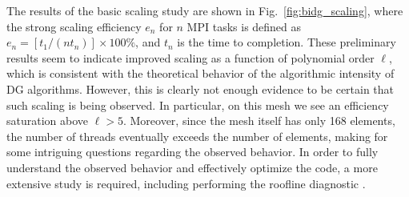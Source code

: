 The results of the basic scaling study are shown in
Fig.~\ref{fig:bidg_scaling}, where the strong scaling efficiency $e_{n}$ for
$n$ MPI tasks is defined as $e_{n}= [t_{1}/(nt_{n})]\times 100\%$, and $t_n$ is the time to
completion. These preliminary results seem to indicate improved scaling as a function of polynomial order $\ell$, which is consistent with the theoretical
behavior of the algorithmic intensity of DG algorithms.  However, this is
clearly not enough evidence to be certain that such scaling is being observed.
In particular, on this mesh we see an efficiency saturation above $\ell>5$.
Moreover, since the mesh itself has only 168 elements, the number of threads
eventually exceeds the number of elements, making for some intriguing questions
regarding the observed behavior.  In order to fully understand the observed behavior and
effectively optimize the code, a more extensive study is required, including performing
%
the roofline diagnostic
\cite{Williams:2009:RIV:1498765.1498785}.

%
%




